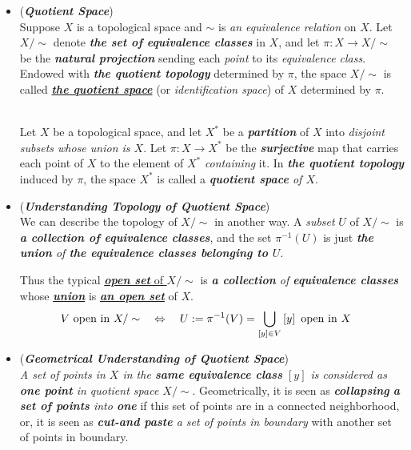 \documentclass[11pt]{article}
\begin{document}
\begin{itemize}
\item \begin{definition}(\emph{\textbf{Quotient Space}})\\
Suppose $X$ is a topological space and $\sim$ is \emph{an equivalence relation} on $X$. Let $X/\sim$ denote \emph{\textbf{the set of equivalence classes}} in $X$, and let $\pi: X \rightarrow X/\sim$ be the \emph{\textbf{natural projection}} sending each \emph{point} to its \emph{equivalence class}. Endowed with \emph{\textbf{the quotient topology}} determined by $\pi$, the space $X/\sim$ is called \underline{\emph{\textbf{the quotient space}}} (or \emph{identification space}) of $X$ determined by $\pi$.
\end{definition}

\begin{definition} \citep{munkres2000topology}\\
Let $X$ be a topological space, and let $X^{*}$ be a \emph{\textbf{partition}} of $X$ into \emph{disjoint subsets whose union is $X$}. Let $\pi: X \rightarrow X^*$ be the \emph{\textbf{surjective}} map that carries each point of $X$ to the element of $X^*$ \emph{containing} it. In \emph{\textbf{the quotient topology}} induced by $\pi$, the space $X^*$ is called a \emph{\textbf{quotient space} of $X$}.
\end{definition}

\item \begin{remark} (\emph{\textbf{Understanding Topology of Quotient Space}})\\
We can describe the topology of $X/\sim$ in another way. A \emph{subset} $U$ of $X/\sim$ is \emph{\textbf{a collection of equivalence classes}}, and the set $\pi^{-1}(U)$ is just \emph{\textbf{the union} of \textbf{the equivalence classes belonging to $U$}}. 

Thus the typical \underline{\emph{\textbf{open set}} of $X/\sim$} is \emph{\textbf{a collection} of \textbf{equivalence classes}} whose \underline{\emph{\textbf{union}}} is \underline{\emph{\textbf{an open set}}} of $X$.
\begin{align*}
V \text{ open in } X/\sim \quad &\Leftrightarrow \quad U:=\pi^{-1}(V) = \bigcup_{[y] \in V}\left[y\right] \text{ open in } X
\end{align*}
\end{remark}

\item \begin{remark} (\emph{\textbf{Geometrical Understanding of Quotient Space}})\\
\emph{A set of points in $X$ in the \textbf{same equivalence class} $[y]$  is considered as \textbf{one point} in quotient space $X/\sim$}. Geometrically, it is seen as \emph{\textbf{collapsing} \textbf{a set of points} into \textbf{one}} if this set of points are in a connected neighborhood, or, it is seen as \emph{\textbf{cut-and paste} a set of points in boundary} with another set of points in boundary.
\end{remark}


\end{itemize}
\end{document}
